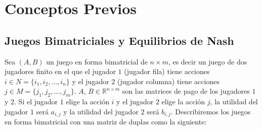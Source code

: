 \chapter{Conceptos Previos}  \label{cap:previos}

\section{Juegos Bimatriciales y Equilibrios de Nash}



Sea $(A, B)$ un juego en forma bimatricial de $n \times m$, es decir un juego de dos jugadores finito en el que el jugador $1$ (jugador fila) tiene acciones $i \in N = \{i_1, i_2, \dots, i_n\}$ y el jugador $2$ (jugador columna) tiene acciones $j \in M = \{j_1, j_2, \dots, j_m\}$. $A$, $B \in \mathbb{R}^{n \times m}$ son las matrices de pago de los jugadores $1$ y $2$. Si el jugador $1$ elige la acción $i$ y el jugador $2$ elige la acción $j$, la utilidad del jugador $1$ será $a_{i,j}$ y la utilidad del jugador $2$ será $b_{i,j}$. Describiremos los juegos en forma bimatricial con una matriz de duplas como la siguiente:

